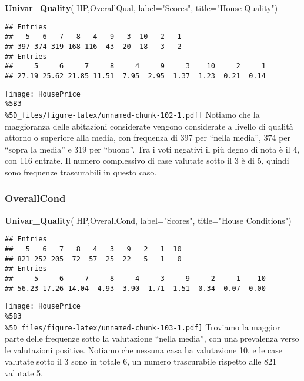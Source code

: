 \documentclass[
]{article}
\newenvironment{Shaded}{\begin{snugshade}}{\end{snugshade}}
\newcommand{\AttributeTok}[1]{\textcolor[rgb]{0.13,0.29,0.53}{#1}}
\newcommand{\FunctionTok}[1]{\textcolor[rgb]{0.13,0.29,0.53}{\textbf{#1}}}
\newcommand{\NormalTok}[1]{#1}
\newcommand{\StringTok}[1]{\textcolor[rgb]{0.31,0.60,0.02}{#1}}
\begin{document}
\begin{Shaded}
\begin{Highlighting}[]
\FunctionTok{Univar\_Quality}\NormalTok{(}
\NormalTok{  HP,OverallQual,}
  \AttributeTok{label=}\StringTok{"Scores"}\NormalTok{,}
  \AttributeTok{title=}\StringTok{"House Quality"}\NormalTok{)}
\end{Highlighting}
\end{Shaded}

\begin{verbatim}
## Entries
##   5   6   7   8   4   9   3  10   2   1 
## 397 374 319 168 116  43  20  18   3   2 
## Entries
##     5     6     7     8     4     9     3    10     2     1 
## 27.19 25.62 21.85 11.51  7.95  2.95  1.37  1.23  0.21  0.14
\end{verbatim}

\texttt{[image: HousePrice\\\%5B3\\\%5D\_files/figure-latex/unnamed-chunk-102-1.pdf]}
Notiamo che la maggioranza delle abitazioni considerate vengono
considerate a livello di qualità attorno o superiore alla media, con
frequenza di 397 per ``nella media'', 374 per ``sopra la media'' e 319
per ``buono''. Tra i voti negativi il più degno di nota è il 4, con 116
entrate. Il numero complessivo di case valutate sotto il 3 è di 5,
quindi sono frequenze trascurabili in questo caso.

\subsubsection{OverallCond}\label{overallcond}

\begin{Shaded}
\begin{Highlighting}[]
\FunctionTok{Univar\_Quality}\NormalTok{(}
\NormalTok{  HP,OverallCond,}
  \AttributeTok{label=}\StringTok{"Scores"}\NormalTok{,}
  \AttributeTok{title=}\StringTok{"House Conditions"}\NormalTok{)}
\end{Highlighting}
\end{Shaded}

\begin{verbatim}
## Entries
##   5   6   7   8   4   3   9   2   1  10 
## 821 252 205  72  57  25  22   5   1   0 
## Entries
##     5     6     7     8     4     3     9     2     1    10 
## 56.23 17.26 14.04  4.93  3.90  1.71  1.51  0.34  0.07  0.00
\end{verbatim}

\texttt{[image: HousePrice\\\%5B3\\\%5D\_files/figure-latex/unnamed-chunk-103-1.pdf]}
Troviamo la maggior parte delle frequenze sotto la valutazione ``nella
media'', con una prevalenza verso le valutazioni positive. Notiamo che
nessuna casa ha valutazione 10, e le case valutate sotto il 3 sono in
totale 6, un numero trascurabile rispetto alle 821 valutate 5.
\end{document}
